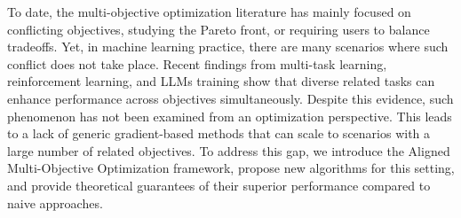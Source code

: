To date, the multi-objective optimization literature has mainly focused on conflicting objectives, studying the Pareto front, or requiring users to balance tradeoffs. Yet, in machine learning practice, there are many scenarios where such conflict does not take place. Recent findings from multi-task learning, reinforcement learning, and LLMs training show that diverse related tasks can enhance performance across objectives simultaneously. Despite this evidence, such phenomenon has not been examined from an optimization perspective. This leads to a lack of generic gradient-based methods that can scale to scenarios with a large number of related objectives.  To address this gap, we introduce the Aligned Multi-Objective Optimization framework, propose new algorithms for this setting, and provide theoretical guarantees of their superior performance compared to naive approaches.